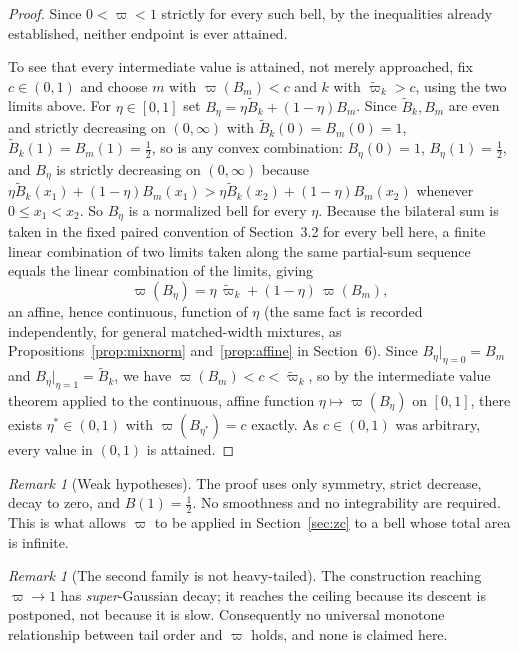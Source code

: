 \documentclass[11pt]{article}
\theoremstyle{definition}
\theoremstyle{plain}
\theoremstyle{remark}
\newtheorem{remark}[definition]{Remark}
\begin{document}
\begin{proof}
Since $0<\varpi<1$ strictly for every such bell, by the inequalities already
established, neither endpoint is ever attained.

To see that every intermediate value is attained, not merely approached, fix
$c\in(0,1)$ and choose $m$ with $\varpi(B_m)<c$ and $k$ with $\widetilde\varpi_k>c$,
using the two limits above. For $\eta\in[0,1]$ set $B_\eta=\eta\widetilde
B_k+(1-\eta)B_m$. Since $\widetilde B_k,B_m$ are even and strictly decreasing on
$(0,\infty)$ with $\widetilde B_k(0)=B_m(0)=1$, $\widetilde B_k(1)=B_m(1)=\tfrac12$, so
is any convex combination: $B_\eta(0)=1$, $B_\eta(1)=\tfrac12$, and $B_\eta$ is
strictly decreasing on $(0,\infty)$ because $\eta\widetilde
B_k(x_1)+(1-\eta)B_m(x_1)>\eta\widetilde B_k(x_2)+(1-\eta)B_m(x_2)$ whenever $0\le
x_1<x_2$. So $B_\eta$ is a normalized bell for every $\eta$. Because the bilateral sum
is taken in the fixed paired convention of Section~3.2 for every bell here, a finite
linear combination of two limits taken along the same partial-sum sequence equals the
linear combination of the limits, giving
\[
\varpi(B_\eta)=\eta\,\widetilde\varpi_k+(1-\eta)\,\varpi(B_m),
\]
an affine, hence continuous, function of $\eta$ (the same fact is recorded
independently, for general matched-width mixtures, as
Propositions~\ref{prop:mixnorm} and~\ref{prop:affine} in Section~6). Since
$B_\eta|_{\eta=0}=B_m$ and $B_\eta|_{\eta=1}=\widetilde B_k$, we have
$\varpi(B_m)<c<\widetilde\varpi_k$, so by the intermediate value theorem applied to the
continuous, affine function $\eta\mapsto\varpi(B_\eta)$ on $[0,1]$, there exists
$\eta^\ast\in(0,1)$ with $\varpi(B_{\eta^\ast})=c$ exactly. As $c\in(0,1)$ was
arbitrary, every value in $(0,1)$ is attained.
\end{proof}

\begin{remark}[Weak hypotheses]\label{rem:weak}
The proof uses only symmetry, strict decrease, decay to zero, and $B(1)=\tfrac12$. No
smoothness and no integrability are required. This is what allows $\varpi$ to be applied
in Section~\ref{sec:zc} to a bell whose total area is infinite.
\end{remark}

\begin{remark}[The second family is not heavy-tailed]
The construction reaching $\varpi\to1$ has \emph{super}-Gaussian decay; it reaches the
ceiling because its descent is postponed, not because it is slow. Consequently no
universal monotone relationship between tail order and $\varpi$ holds, and none is
claimed here.
\end{remark}
\end{document}
